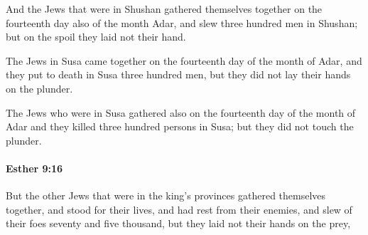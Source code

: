 			\begin{versebox}
					\item[BHS] 
					\item[LXX] 
					\item[ASV] And the Jews that were in Shushan gathered themselves together on the fourteenth day also of the month Adar, and slew three hundred men in Shushan; but on the spoil they laid not their hand.
					\item[NIV] The Jews in Susa came together on the fourteenth day of the month of Adar, and they put to death in Susa three hundred men, but they did not lay their hands on the plunder.
					\item[NRSV] The Jews who were in Susa gathered also on the fourteenth day of the month of Adar and they killed three hundred persons in Susa; but they did not touch the plunder.
			\end{versebox}

		\paragraph{Esther 9:16} %
			\label{ESTHER-9-16}

			But the other Jews that were in the king’s provinces gathered themselves together, and stood for their lives, and had rest from their enemies, and slew of their foes seventy and five thousand, but they laid not their hands on the prey,


